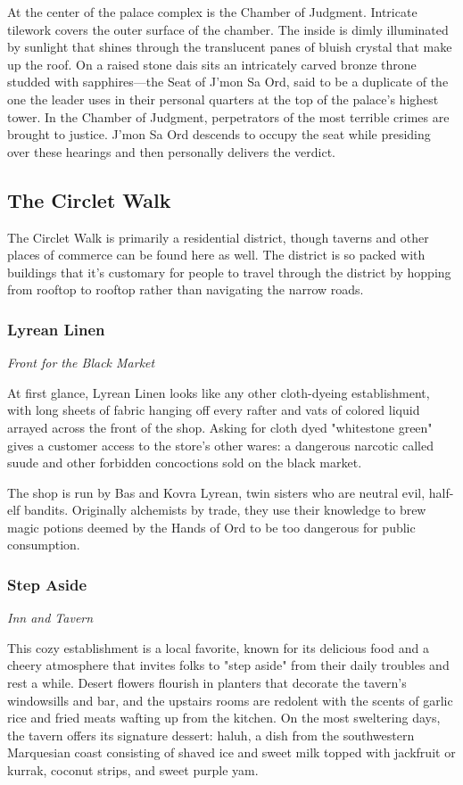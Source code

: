 \documentclass[10pt,a4paper,twoside,fancy,bg=print,twocolumn,openany,nodeprecatedcode]{dndbook}
\begin{document}
At the center of the palace complex is the Chamber of Judgment. Intricate tilework covers the outer surface of the chamber. The inside is dimly illuminated by sunlight that shines through the translucent panes of bluish crystal that make up the roof. On a raised stone dais sits an intricately carved bronze throne studded with sapphires—the Seat of J'mon Sa Ord, said to be a duplicate of the one the leader uses in their personal quarters at the top of the palace's highest tower. In the Chamber of Judgment, perpetrators of the most terrible crimes are brought to justice. J'mon Sa Ord descends to occupy the seat while presiding over these hearings and then personally delivers the verdict.

\subsection{The Circlet Walk}
The Circlet Walk is primarily a residential district, though taverns and other places of commerce can be found here as well. The district is so packed with buildings that it's customary for people to travel through the district by hopping from rooftop to rooftop rather than navigating the narrow roads.

\subsubsection{Lyrean Linen}
\textit{Front for the Black Market}

At first glance, Lyrean Linen looks like any other cloth-dyeing establishment, with long sheets of fabric hanging off every rafter and vats of colored liquid arrayed across the front of the shop. Asking for cloth dyed "whitestone green" gives a customer access to the store's other wares: a dangerous narcotic called suude and other forbidden concoctions sold on the black market.

The shop is run by Bas and Kovra Lyrean, twin sisters who are neutral evil, half-elf bandits. Originally alchemists by trade, they use their knowledge to brew magic potions deemed by the Hands of Ord to be too dangerous for public consumption.

\subsubsection{Step Aside}
\textit{Inn and Tavern}

This cozy establishment is a local favorite, known for its delicious food and a cheery atmosphere that invites folks to "step aside" from their daily troubles and rest a while. Desert flowers flourish in planters that decorate the tavern's windowsills and bar, and the upstairs rooms are redolent with the scents of garlic rice and fried meats wafting up from the kitchen. On the most sweltering days, the tavern offers its signature dessert: haluh, a dish from the southwestern Marquesian coast consisting of shaved ice and sweet milk topped with jackfruit or kurrak, coconut strips, and sweet purple yam.
\end{document}
